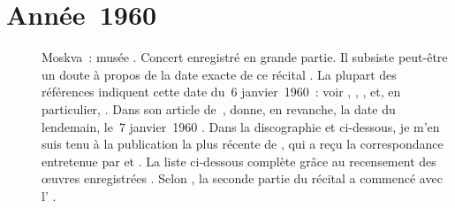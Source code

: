 \section{Année~1960}

\begin{description}
 \item[]
 Moskva~: musée \Scriabine{}.
 Concert enregistré en grande partie.
 Il subsiste peut-être un doute à propos de la date exacte de ce récital
 \citep[voir][]{TADGO1960}.
 La plupart des références indiquent cette date du~6 janvier~1960~: voir
 \citet[p.~461]{Milshteyn82a}, \citet{Evans08}, \citet[p.~23]{Nikonovich11},
 \citet[p.~442]{Scriabine} et, en particulier, \citet[p.~182]{Nekrasova08}.
 Dans son article de~\citeyear{Nekrasova95}, \citeauthor{Nekrasova95} donne,
 en revanche, la date du lendemain, le~7 janvier~1960
 \citep[voir][]{Nekrasova95}.
 Dans la discographie et ci-dessous, je m'en suis tenu à la publication la
 plus récente de \VNekrasova{}, qui a reçu la correspondance entretenue par
 \VSofronitsky{} et \AVizel{}.
 La liste ci-dessous complète \citet[p.~442]{Scriabine} grâce au recensement
 des œuvres enregistrées \citep[voir][p.~23 et~30]{Nikonovich11}.
 Selon \citet[p.~442]{Scriabine}, la seconde partie du récital a commencé
 avec l' .


\end{description}
